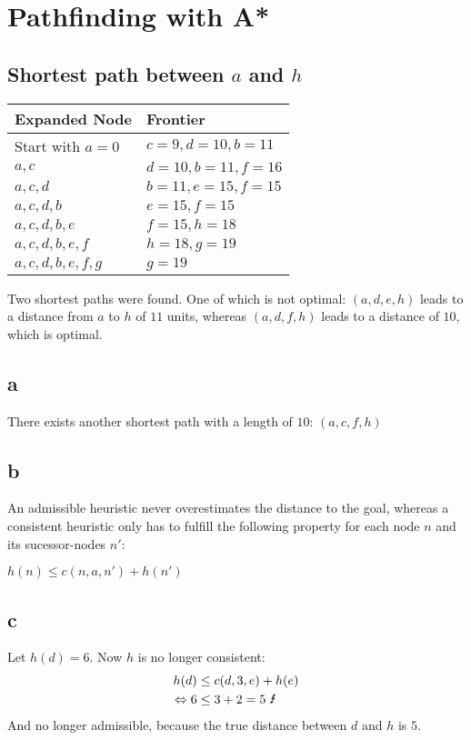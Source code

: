 \documentclass[12pt,a4paper]{scrartcl}
\begin{document}
	
\section{Pathfinding with A*}
\subsection*{Shortest path between $a$ and $h$}
\begin{table}[h]
	\centering
	\begin{tabular}{l|l}
		Expanded Node    & Frontier           \\ \hline
		Start with $a=0$ & $c=9, d=10, b=11$  \\
		$a,c$            & $d=10, b=11,f=16$  \\
		$a,c,d$          & $b=11, e=15, f=15$ \\
		$a,c,d,b$        & $e=15, f=15$       \\
		$a,c,d,b,e$      & $f=15, h=18$       \\
		$a,c,d,b,e,f$    & $h=18, g=19$       \\
		$a,c,d,b,e,f,g$  & $g=19$            
	\end{tabular}
\end{table}

Two shortest paths were found. One of which is not optimal: $(a,d,e,h)$ leads to a distance from $a$ to $h$ of $11$ units, whereas $(a,d,f,h)$ leads to a distance of $10$, which is optimal. \\

\subsection*{a}
There exists another shortest path with a length of $10$: $(a,c,f,h)$

\subsection*{b}
An admissible heuristic never overestimates the distance to the goal, whereas a consistent heuristic only has to fulfill the following property for each node $n$ and its sucessor-nodes $n'$: 
\begin{center}
	$h(n) \leq c(n,a,n') + h(n')$
\end{center}

\subsection*{c}
Let $h(d) = 6$. Now $h$ is no longer consistent: 
\begin{align*}
	h(d) &\leq c(d,3,e) + h(e) \\
	\Leftrightarrow 6 &\leq 3+2 = 5  \mbox{     \Lightning} \\
\end{align*}
And no longer admissible, because the true distance between $d$ and $h$ is $5$. \\\\
\end{document}
